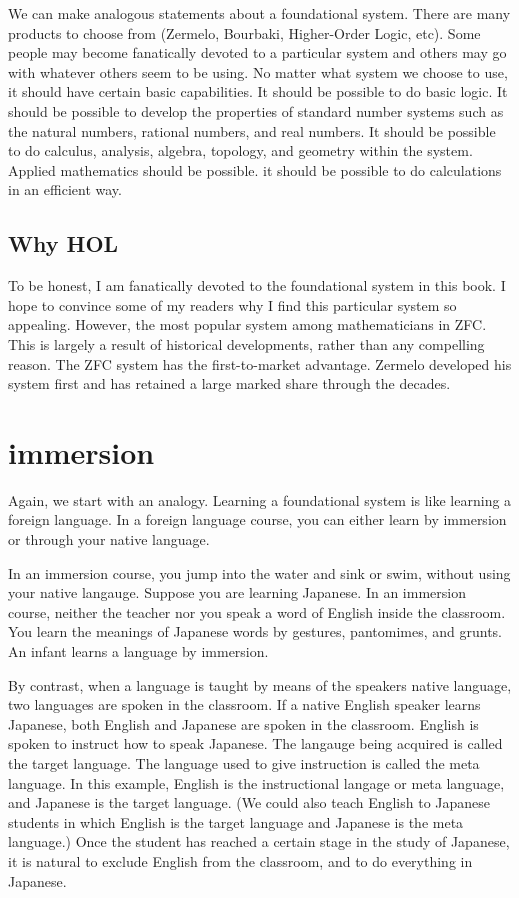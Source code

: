 \documentclass[cup9a]{cupbook}
\begin{document}
We can make analogous statements about a foundational system.  There are
many products to choose from (Zermelo, Bourbaki, Higher-Order Logic, etc).  Some people may become fanatically devoted to a particular system and others may go with whatever others seem to be using.  No matter what system we choose to use, it should have certain basic capabilities.  It should be possible to do basic logic.  It should be possible to develop the properties of standard number systems such as the natural numbers, rational numbers, and real numbers.  It should be possible to do calculus, analysis, algebra, topology, and geometry within the system.  Applied mathematics should be possible.  it should be possible to do calculations in an efficient way.

\subsection{Why HOL}

To be honest, I am fanatically devoted to the foundational system in this book.  I hope to convince some of my readers why I find this particular system so appealing.  However, the most popular system among mathematicians in ZFC.  This is largely a result of historical developments, rather than any compelling reason.  The ZFC system has the first-to-market advantage.  Zermelo developed his system first and has retained a large marked share through the decades.



\section{immersion}

Again, we start with an analogy.  Learning a foundational system is like learning a foreign language.  In a foreign language course, you can either learn by immersion or through your native language.  

In an immersion course, you jump into the water and sink or swim, without using your native langauge.  Suppose you are learning Japanese.  In an immersion course, neither the teacher nor you speak a word of English inside the classroom.  You learn the meanings of Japanese words by gestures, pantomimes, and grunts.  An infant learns a language by immersion.  

By contrast, when a language is taught by means of the speakers native language, two languages are spoken in the classroom.  If a native English speaker learns Japanese, both English and Japanese are spoken in the classroom.  English is spoken to instruct how to speak Japanese.   The langauge being acquired is called the target language.  The language used to give instruction is called the meta language.  In this example, English is the instructional langage or meta language, and Japanese is the target language.  (We could also teach English to Japanese students in which English is the target language and Japanese is the meta language.)  Once the student has reached a certain stage in the study of Japanese, it is natural to exclude English from the classroom, and to do everything in Japanese.
\end{document}
